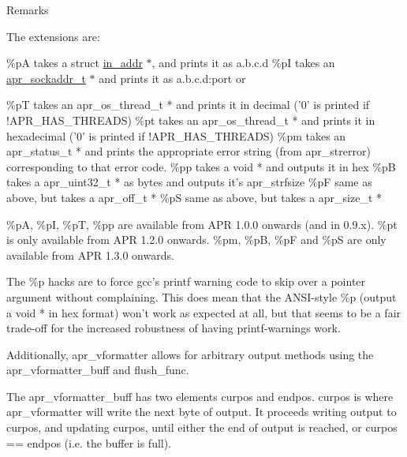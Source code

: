 \begin{DoxyRemark}{Remarks}

\begin{DoxyPre}
The extensions are:\end{DoxyPre}

\end{DoxyRemark}
\%pA takes a struct \mbox{\hyperlink{structin__addr}{in\+\_\+addr}} $\ast$, and prints it as a.\+b.\+c.\+d \%pI takes an \mbox{\hyperlink{structapr__sockaddr__t}{apr\+\_\+sockaddr\+\_\+t}} $\ast$ and prints it as a.\+b.\+c.\+d\+:port or


\begin{DoxyPre}\%pT takes an apr\_os\_thread\_t * and prints it in decimal
     ('0' is printed if !APR\_HAS\_THREADS)
\%pt takes an apr\_os\_thread\_t * and prints it in hexadecimal
     ('0' is printed if !APR\_HAS\_THREADS)
\%pm takes an apr\_status\_t * and prints the appropriate error
     string (from apr\_strerror) corresponding to that error code.
\%pp takes a void * and outputs it in hex
\%pB takes a apr\_uint32\_t * as bytes and outputs it's apr\_strfsize
\%pF same as above, but takes a apr\_off\_t *
\%pS same as above, but takes a apr\_size\_t *\end{DoxyPre}



\begin{DoxyPre}\%pA, \%pI, \%pT, \%pp are available from APR 1.0.0 onwards (and in 0.9.x).
\%pt is only available from APR 1.2.0 onwards.
\%pm, \%pB, \%pF and \%pS are only available from APR 1.3.0 onwards.\end{DoxyPre}



\begin{DoxyPre}The \%p hacks are to force gcc's printf warning code to skip
over a pointer argument without complaining.  This does
mean that the ANSI-style \%p (output a void * in hex format) won't
work as expected at all, but that seems to be a fair trade-off
for the increased robustness of having printf-warnings work.\end{DoxyPre}



\begin{DoxyPre}Additionally, apr\_vformatter allows for arbitrary output methods
using the apr\_vformatter\_buff and flush\_func.\end{DoxyPre}



\begin{DoxyPre}The apr\_vformatter\_buff has two elements curpos and endpos.
curpos is where apr\_vformatter will write the next byte of output.
It proceeds writing output to curpos, and updating curpos, until
either the end of output is reached, or curpos == endpos (i.e. the
buffer is full).\end{DoxyPre}



